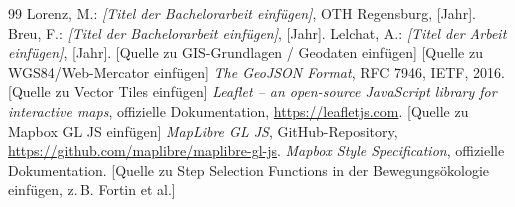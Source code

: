 \documentclass[12pt,a4paper]{report}
\begin{document}
\begin{thebibliography}{99}
 Lorenz, M.: \emph{[Titel der Bachelorarbeit einfügen]}, OTH Regensburg, [Jahr].
 Breu, F.: \emph{[Titel der Bachelorarbeit einfügen]}, [Jahr].
 Lelchat, A.: \emph{[Titel der Arbeit einfügen]}, [Jahr].
 [Quelle zu GIS-Grundlagen / Geodaten einfügen]
 [Quelle zu WGS84/Web-Mercator einfügen]
 \emph{The GeoJSON Format}, RFC 7946, IETF, 2016.
 [Quelle zu Vector Tiles einfügen]
 \emph{Leaflet -- an open-source JavaScript library for interactive maps}, offizielle Dokumentation, \url{https://leafletjs.com}.
 [Quelle zu Mapbox GL JS einfügen]
 \emph{MapLibre GL JS}, GitHub-Repository, \url{https://github.com/maplibre/maplibre-gl-js}.
 \emph{Mapbox Style Specification}, offizielle Dokumentation.
 [Quelle zu Step Selection Functions in der Bewegungsökologie einfügen, z.\,B. Fortin et al.]
\end{thebibliography}
\end{document}
